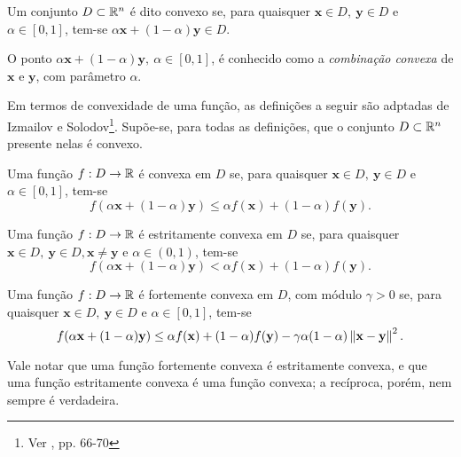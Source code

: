 \begin{definition}
Um conjunto $D \subset \mathbb{R}^{n}$ \'{e} dito convexo se, para quaisquer $\mathbf{x} \in D,~\mathbf{y} \in D$ e $\alpha \in [0,1]$, tem-se $\alpha\mathbf{x} + (1-\alpha)\mathbf{y} \in D$.
\end{definition}

O ponto $\alpha\mathbf{x} + (1-\alpha)\mathbf{y},~\alpha \in [0,1]$, \'{e} conhecido como a \textit{combina\c{c}\~{a}o convexa} de $\mathbf{x}$ e $\mathbf{y}$, com par\^{a}metro $\alpha$.

Em termos de convexidade de uma fun\c{c}\~{a}o, as defini\c{c}\~{o}es a seguir s\~{a}o adptadas de Izmailov e Solodov\footnote{Ver \cite{izmailov}, pp. 66-70}. Sup\~{o}e-se, para todas as defini\c{c}\~{o}es, que o conjunto $D \subset \mathbb{R}^{n}$ presente nelas \'{e} convexo.

\begin{definition}\label{convDef}
Uma fun\c{c}\~{a}o $f: D \to \mathbb{R}$ \'{e} convexa em $D$ se, para quaisquer $\mathbf{x} \in D,~\mathbf{y} \in D$ e $\alpha \in [0,1]$, tem-se
\begin{equation}
f(\alpha\mathbf{x} + (1-\alpha)\mathbf{y}) \le \alpha f(\mathbf{x}) + (1-\alpha)f(\mathbf{y}).
\end{equation}
\end{definition}

\begin{definition}
Uma fun\c{c}\~{a}o $f: D \to \mathbb{R}$ \'{e} estritamente convexa em $D$ se, para quaisquer $\mathbf{x} \in D,~\mathbf{y} \in D, \mathbf{x} \ne \mathbf{y}$ e $\alpha \in (0,1)$, tem-se
\begin{equation}
f(\alpha\mathbf{x} + (1-\alpha)\mathbf{y}) < \alpha f(\mathbf{x}) + (1-\alpha)f(\mathbf{y}).
\end{equation}
\end{definition}

\begin{definition}
Uma fun\c{c}\~{a}o $f: D \to \mathbb{R}$ \'{e} fortemente convexa em $D$, com m\'{o}dulo $\gamma > 0$ se, para quaisquer $\mathbf{x} \in D,~\mathbf{y} \in D$ e $\alpha \in [0,1]$, tem-se
\begin{equation}
f(\alpha\mathbf{x} + (1-\alpha)\mathbf{y}) \le \alpha f(\mathbf{x}) + (1-\alpha)f(\mathbf{y}) - \gamma\alpha(1-\alpha)\left\lVert\mathbf{x}-\mathbf{y}\right\rVert^2.
\end{equation}
\end{definition}

Vale notar que uma fun\c{c}\~{a}o fortemente convexa \'{e} estritamente convexa, e que uma fun\c{c}\~{a}o estritamente convexa \'{e} uma fun\c{c}\~{a}o convexa; a rec\'{i}proca, por\'{e}m, nem sempre \'{e} verdadeira.

